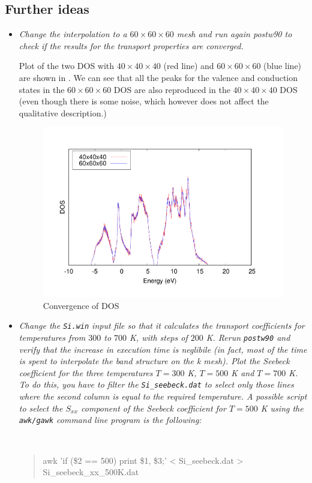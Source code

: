 \subsection*{Further ideas}
\begin{itemize}
  \item {\it Change the interpolation to a $60\times60\times60$ mesh and run again postw90 to check if the results
for the transport properties are converged.}

Plot of the two DOS with $40\times40\times40$ (red line) and $60\times60\times60$ (blue line) are shown in . We can see that all the peaks for the valence and conduction states in the $60\times60\times60$ DOS are also reproduced in the $40\times40\times40$ DOS (even though there is some noise, which however does not affect the qualitative description.)

\begin{figure}[h!]
\centering
\includegraphics[width=0.7\columnwidth]{figure/example16/Si_boltzdos_convergence.pdf}
\caption{Convergence of DOS}\label{fig16.3}
\end{figure}

  \item {\it Change the {\tt Si.win} input file so that it calculates the transport coefficients for temperatures from
$300$ to $700$ K, with steps of $200$ K. Rerun {\tt postw90} and verify that the increase in execution time
is neglibile (in fact, most of the time is spent to interpolate the band structure on the k mesh).
Plot the Seebeck coefficient for the three temperatures $T = 300$ K, $T = 500$ K and $T = 700$ K.
To do this, you have to filter the {\tt Si\_seebeck.dat} to select only those lines where the second
column is equal to the required temperature. A possible script to select the $S_{xx}$ component of the
Seebeck coefficient for $T = 500$ K using the {\tt awk/gawk} command line program is the following:
{\tt 
\begin{quote}
awk '{if (\$2 == 500) {print \$1, \$3;}}' < Si\_seebeck.dat > Si\_seebeck\_xx\_500K.dat
\end{quote}}
}


\end{itemize}
